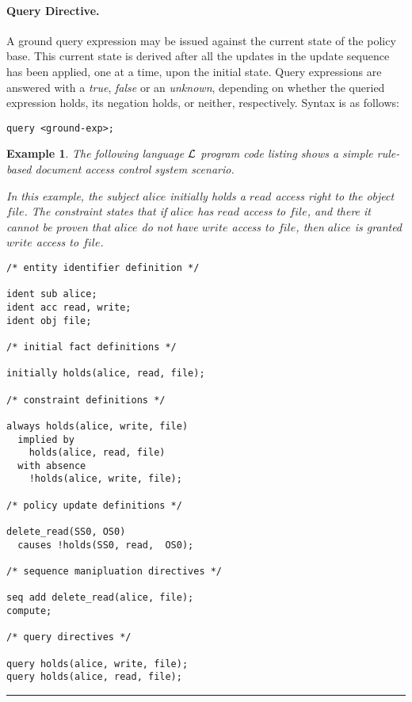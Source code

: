 \documentclass[10pt, twocolumn]{article}
\newtheorem{examp}{Example}
\newenvironment{example}{\begin{examp}\rm}{\rule{2mm}{2mm}\end{examp}}
\begin{document}
        \paragraph{Query Directive.}

          A ground query expression may be issued against the current state of
          the policy base. This current state is derived after all the updates
          in the update sequence has been applied, one at a time, upon the
          initial state. Query expressions are answered with a \emph{true},
          \emph{false} or an \emph{unknown}, depending on whether the queried
          expression holds, its negation holds, or neither, respectively.
          Syntax is as follows:

          \begin{verbatim}query <ground-exp>;\end{verbatim} 

        \begin{example}
          The following language ${\cal L}$ program code listing shows a simple
          rule-based document access control system scenario.

          In this example, the subject $alice$ initially holds a $read$ access
          right to the object $file$. The constraint states that if $alice$
          has $read$ access to $file$, and there it cannot be proven that
          $alice$ do not have $write$ access to $file$, then $alice$ is granted
          $write$ access to $file$.

          \begin{verbatim}
/* entity identifier definition */

ident sub alice;
ident acc read, write;
ident obj file;

/* initial fact definitions */

initially holds(alice, read, file);

/* constraint definitions */

always holds(alice, write, file) 
  implied by
    holds(alice, read, file)
  with absence
    !holds(alice, write, file);

/* policy update definitions */

delete_read(SS0, OS0)
  causes !holds(SS0, read,  OS0);

/* sequence manipluation directives */

seq add delete_read(alice, file);
compute;

/* query directives */

query holds(alice, write, file);
query holds(alice, read, file);
          \end{verbatim}
        \end{example}
\end{document}
